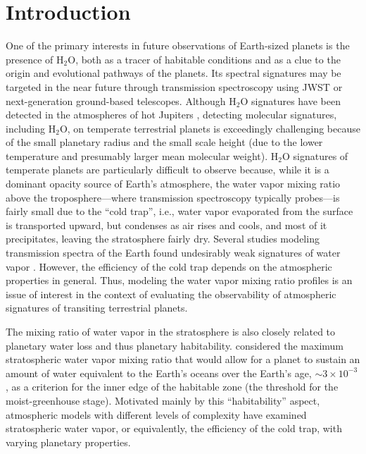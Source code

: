 \documentclass[11pt,numberedappendix,twocolappendix,]{emulateapj}
\def\water{H$_2$O}
\def\wv{water vapor}
\begin{document}



\section{Introduction}
\label{s:intro}

One of the primary interests in future observations of Earth-sized planets is the presence of \water{}, both as a tracer of habitable conditions and as a clue to the origin and evolutional pathways of the planets. 
Its spectral signatures may be targeted in the near future through transmission spectroscopy using JWST or next-generation ground-based telescopes.
%
Although \water{} signatures have been detected in the atmospheres of hot Jupiters \citep[e.g.][]{Sing2016}, detecting molecular signatures, including \water{}, on temperate terrestrial planets is exceedingly challenging \citep{Cowan2015} because of the small planetary radius and the small scale height (due to the lower temperature and presumably larger mean molecular weight).  
\water{} signatures of temperate planets are particularly difficult to observe because, while it is a dominant opacity source of Earth's atmosphere, the \wv{}  mixing ratio above the troposphere---where transmission spectroscopy typically probes---is fairly small due to the ``cold trap'', i.e., \wv{} evaporated from the surface is transported upward, but condenses as air rises and cools, and most of it precipitates, leaving the stratosphere fairly dry. 
Several studies modeling transmission spectra of the Earth found undesirably weak signatures of \wv{} \citep[e.g.][]{Ehrenreich2006, Kaltenegger2009, Betremieux2013, Misra2014}. 
However, the efficiency of the cold trap depends on the atmospheric properties in general. 
Thus, modeling the \wv{} mixing ratio profiles is an issue of interest in the context of evaluating the observability of atmospheric signatures of transiting terrestrial planets. 

The mixing ratio of \wv{} in the stratosphere is also closely related to planetary water loss and thus planetary habitability. 
\citet{Kasting1993} considered the maximum stratospheric \wv{} mixing ratio that would allow for a planet to sustain an amount of water equivalent to the  Earth's oceans over the Earth's age, $\sim 3 \times 10^{-3}$, as a criterion for the inner edge of the habitable zone (the threshold for the moist-greenhouse stage). 
Motivated mainly by this ``habitability'' aspect, atmospheric models with different levels of complexity have examined stratospheric \wv{}, or equivalently, the efficiency of the cold trap, with varying planetary properties. 
\end{document}
